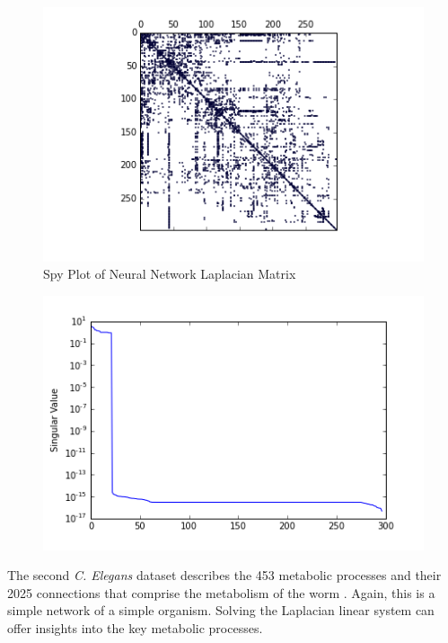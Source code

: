 \documentclass{article}
\begin{document}
\begin{figure}
\centering
\includegraphics[width = \linewidth]{neuralspy.png}
\caption{Spy Plot of Neural Network Laplacian Matrix}
\end{figure}
\begin{figure}
\centering
\includegraphics[width = \linewidth]{neuralsing.png}
\end{figure}

The second \textit{C. Elegans} dataset describes the 453 metabolic processes and their 2025 connections that comprise the metabolism of the worm \cite{Duch:2005}. Again, this is a simple network of a simple organism. Solving the Laplacian linear system can offer insights into the key metabolic processes.
\end{document}
